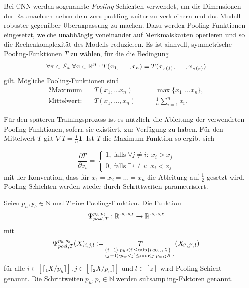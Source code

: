 Bei CNN werden sogenannte \textit{Pooling}-Schichten verwendet, um die Dimensionen der Raumachsen neben dem zero padding weiter zu verkleinern und das Modell robuster gegenüber Überanpassung zu machen. Dazu werden Pooling-Funktionen eingesetzt, welche unabhängig voneinander auf Merkmalskarten operieren und so die Rechenkomplexität des Modells reduzieren. Es ist sinnvoll, symmetrische Pooling-Funktionen $T$ zu wählen, für die die Bedingung
\begin{equation*}
    \forall \pi \in S_n \; \forall x \in \mathbb{R}^n: T(x_1, \ldots, x_n)=T(x_{\pi(1)}, \ldots, x_{\pi(n)})
\end{equation*}
gilt. Mögliche Pooling-Funktionen sind 
\begin{alignat*}{2}
    \text{Maximum}: \; \;&T(x_1, \ldots x_n) &&= \max\{x_1, \ldots x_n\},\\
    \text{Mittelwert}: \; \;&T(x_1, \ldots, x_n) &&= \frac{1}{n} \sum_{i=1}^n x_i. 
 \end{alignat*}

Für den späteren Trainingsprozess ist es nützlich, die Ableitung der verwendeten Pooling-Funktionen, sofern sie existiert, zur Verfügung zu haben. Für den Mittelwert $T$ gilt $\nabla T=\frac{1}{n} \textbf{1}$. Ist $T$ die Maximum-Funktion so ergibt sich

\begin{equation*}
    \frac{\partial T}{\partial x_i}= \begin{cases}
        1 , \; \text{falls}  \; \forall j \neq i: \; x_i >x_j \\
        0 , \; \text{falls}  \; \exists j \neq i: \; x_i <x_j
    \end{cases}
\end{equation*}
mit der Konvention, dass für $x_1=x_2= \ldots=x_n$ die Ableitung auf $\frac{1}{2}
$ gesetzt wird. Pooling-Schichten werden wieder durch Schrittweiten parametrisiert.

\begin{defi}
    Seien $p_h, p_b \in \mathbb{N}$ und $T$ eine Pooling-Funktion. Die Funktion 
    \begin{equation*}
        \Psi_{pool,T}^{p_h,p_b}: \mathbb{R}^{\cdot \times \cdot \times z} \rightarrow \mathbb{R}^{\cdot \times \cdot\times z}
    \end{equation*}
    mit
    \begin{equation*}
        \Psi_{pool,T}^{p_h,p_b}(X)_{i,j,l}:= \mathop{T}_{\begin{subarray}{l}(i-1) \cdot p_h < i' \leq \min\{i \cdot p_h, {}_1 X\} \\ 
        (j-1) \cdot p_w < j' \leq \min\{j \cdot p_w, {}_2 X\}\end{subarray}} (X_{i',j',l})  
    \end{equation*}
    für alle  $i \in [\lceil {}_1 X/p_h \rceil], j \in [\lceil {}_2 X/p_w \rceil]$ und $l \in [z]$ wird Pooling-Schicht genannt. Die Schrittweiten $p_h, p_b \in \mathbb{N}$ werden subsampling-Faktoren genannt.
\end{defi}

